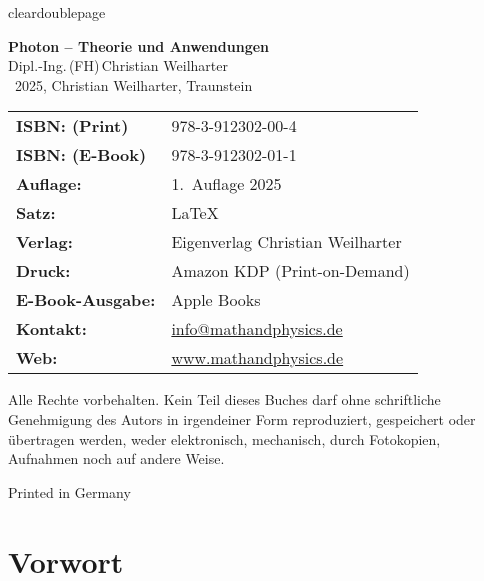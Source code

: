 cleardoublepage
\thispagestyle{empty}
\pagestyle{fancy}
\fancyfoot[C]{\thepage}   %
\fancyfoot[L]{}
\fancyfoot[R]{}


\begin{center}


{\Large\textbf{Photon – Theorie und Anwendungen}}\\[1.2em]
{\large Dipl.-Ing.\,(FH)\,Christian Weilharter}\\[1.2em]
\textcopyright~2025, Christian Weilharter, Traunstein\\[2em]
\end{center}
\begin{flushleft}
	\begin{tabular}{@{}l l}
	
	
		\textbf{ISBN: (Print)} & 978-3-912302-00-4 \\[0.5em]
			\textbf{ISBN: (E-Book)} & 978-3-912302-01-1 \\[0.5em]
		\textbf{Auflage:} & 1.~Auflage 2025 \\[0.5em]
		\textbf{Satz:} & \LaTeX \\[0.5em]
		\textbf{Verlag:} & Eigenverlag Christian Weilharter \\[0.5em]
		\textbf{Druck:} & Amazon KDP (Print-on-Demand) \\[0.5em]

			\textbf{E-Book-Ausgabe:} & Apple Books\\[0.5em]
		
		\textbf{Kontakt:} & \href{mailto:info@mathandphysics.de}{info@mathandphysics.de}\\[0.5em]
		\textbf{Web:} & \href{https://www.mathandphysics.de}{www.mathandphysics.de}\\
		

	\end{tabular}
\end{flushleft}

\vspace{2em}
\noindent
Alle Rechte vorbehalten. Kein Teil dieses Buches darf ohne schriftliche Genehmigung des Autors 
in irgendeiner Form reproduziert, gespeichert oder übertragen werden, 
weder elektronisch, mechanisch, durch Fotokopien, Aufnahmen noch auf andere Weise.
\begin{center}\small Printed in Germany\end{center}


\chapter*{Vorwort}



